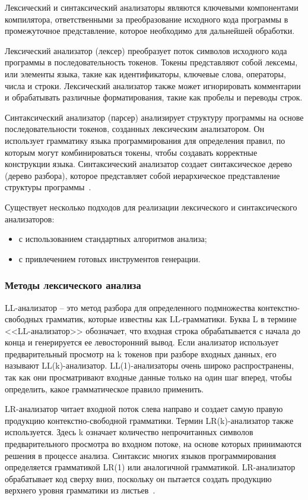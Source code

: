 Лексический и синтаксический анализаторы являются ключевыми компонентами компилятора, ответственными за преобразование исходного кода программы в промежуточное представление, которое необходимо для дальнейшей обработки.

Лексический анализатор (лексер) преобразует поток символов исходного кода программы в последовательность токенов.
Токены представляют собой лексемы, или элементы языка, такие как идентификаторы, ключевые слова, операторы, числа и строки.
Лексический анализатор также может игнорировать комментарии и обрабатывать различные форматирования, такие как пробелы и переводы строк.

Синтаксический анализатор (парсер) анализирует структуру программы на основе последовательности токенов, созданных лексическим анализатором.
Он использует грамматику языка программирования для определения правил, по которым могут комбинироваться токены, чтобы создавать корректные конструкции языка.
Синтаксический анализатор создает синтаксическое дерево (дерево разбора), которое представляет собой иерархическое представление структуры программы~\cite{aho1978synt, kandomski2018lexers}.


Существует несколько подходов для реализации лексического и синтаксического анализаторов:
\begin{itemize}
    \item с использованием стандартных алгоритмов анализа;
    \item с привлечением готовых инструментов генерации.
\end{itemize}

\subsubsection*{Методы лексического анализа}


LL-анализатор -- это метод разбора для определенного подмножества контекстно-свободных грамматик, которые известны как LL-грамматики.
Буква L в термине <<LL-анализатор>> обозначает, что входная строка обрабатывается с начала до конца и генерируется ее левосторонний вывод.
Если анализатор использует предварительный просмотр на k токенов при разборе входных данных, его называют LL(k)-анализатор.
LL(1)-анализаторы очень широко распространены, так как они просматривают входные данные только на один шаг вперед, чтобы определить, какое грамматическое правило применить.

LR-анализатор читает входной поток слева направо и создает самую правую продукцию контекстно-свободной грамматики.
Термин LR(k)-анализатор также используется.
Здесь k означает количество непрочитанных символов предварительного просмотра во входном потоке, на основе которых принимаются решения в процессе анализа.
Синтаксис многих языков программирования определяется грамматикой LR(1) или аналогичной грамматикой.
LR-анализатор обрабатывает код сверху вниз, поскольку он пытается создать продукцию верхнего уровня грамматики из листьев~\cite{sippu2013parsing}.


